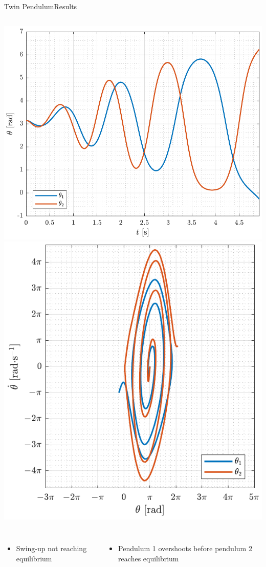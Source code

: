 \begin{frame}{Twin Pendulum}{Results}
  \begin{columns}[c]
      \includegraphics[width=.85\textwidth]{figures/thetaSwingAttempt}
      \includegraphics[width=.85\textwidth]{figures/phaseSwingAttempt}
  \end{columns}
  \begin{columns}[c]
    \begin{itemize}\vspace{-12pt}
      \item Swing-up not reaching equilibrium
    \end{itemize}
    \begin{itemize}
      \item Pendulum 1 overshoots before pendulum 2 reaches equilibrium
    \end{itemize}
  \end{columns}
\end{frame}

